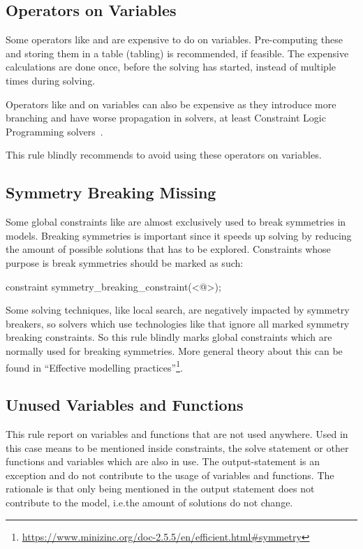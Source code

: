 \documentclass[a4paper,12pt]{article}
\newcommand{\mi}[1]{\mbox{\mzninline{#1}}}
\begin{document}
\subsection{Operators on Variables}\label{sec:rule:opvar}
Some operators like \mi{div} and \mi{pow} are expensive to do on variables. Pre-computing
these and storing them in a table (tabling) is recommended, if feasible. The expensive
calculations are done once, before the solving has started, instead of multiple times
during solving.

Operators like \mi{\\/} and \mi{->} on variables can also be expensive as they introduce
more branching and have worse propagation in solvers, at least Constraint Logic
Programming solvers~\cite[p.~430]{constraintshandbook}.

This rule blindly recommends to avoid using these operators on variables.

\subsection{Symmetry Breaking Missing}\label{sec:rule:symbreak}
Some global constraints like \mi{value_precede_chain} are almost exclusively used to break
symmetries in models. Breaking symmetries is important since it speeds up solving by
reducing the amount of possible solutions that has to be explored. Constraints whose
purpose is break symmetries should be marked as such:
\begin{mznnobreak}
constraint symmetry_breaking_constraint(<@\dots@>);
\end{mznnobreak}
Some solving techniques, like local search, are negatively impacted
by symmetry breakers, so solvers which use technologies like that ignore all marked
symmetry breaking constraints. So this rule blindly marks global constraints which are
normally used for breaking symmetries. More general theory about this can be found in
``Effective modelling practices''\footnote{\url{https://www.minizinc.org/doc-2.5.5/en/efficient.html\#symmetry}}.

\subsection{Unused Variables and Functions}\label{sec:rule:unused}
This rule report on variables and functions that are not used anywhere.
Used in this case means to be mentioned inside constraints, the solve statement or other
functions and variables which are also in use. The output-statement is an exception and
do not contribute to the usage of variables and functions. The rationale is that only being
mentioned in the output statement does not contribute to the model, i.e.\@ the amount of
solutions do not change.
\end{document}
